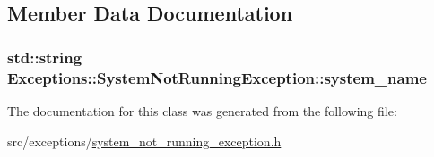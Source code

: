 \subsection{Member Data Documentation}
\hypertarget{class_exceptions_1_1_system_not_running_exception_af97cd0ba9e5c5b4aa57b99028b6bb95a}{}
\subsubsection[{system\+\_\+name}]{\setlength{\rightskip}{0pt plus 5cm}std\+::string Exceptions\+::\+System\+Not\+Running\+Exception\+::system\+\_\+name\hspace{0.3cm}{\ttfamily [private]}}\label{class_exceptions_1_1_system_not_running_exception_af97cd0ba9e5c5b4aa57b99028b6bb95a}


The documentation for this class was generated from the following file\+:\begin{DoxyCompactItemize}
\item 
src/exceptions/\hyperlink{system__not__running__exception_8h}{system\+\_\+not\+\_\+running\+\_\+exception.\+h}\end{DoxyCompactItemize}
